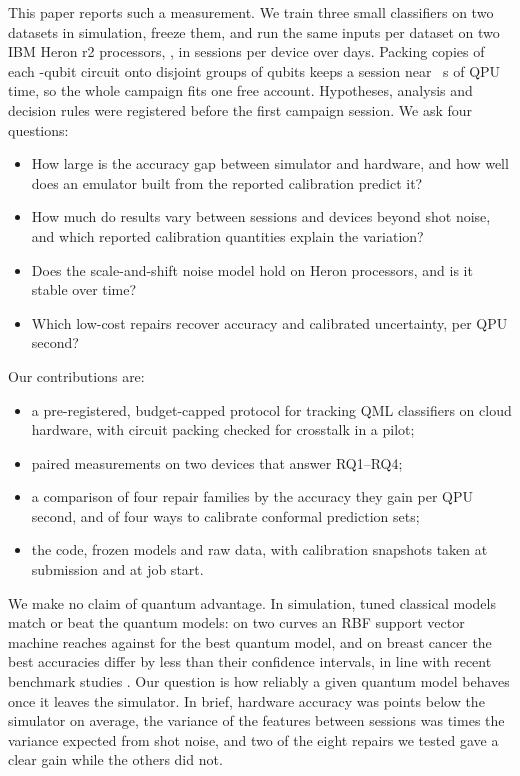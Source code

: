 This paper reports such a measurement. We train three small classifiers on two datasets in
simulation, freeze them, and run the same  inputs per dataset on two IBM
Heron r2 processors, , in  sessions per device over
 days. Packing  copies of each -qubit circuit onto
disjoint groups of qubits keeps a session near ~s of QPU time, so the
whole campaign fits one free account. Hypotheses, analysis and decision rules were registered
before the first campaign session. We ask four questions:
\begin{itemize}
\item[RQ1] How large is the accuracy gap between simulator and hardware, and how well does an
emulator built from the reported calibration predict it?
\item[RQ2] How much do results vary between sessions and devices beyond shot noise, and which
reported calibration quantities explain the variation?
\item[RQ3] Does the scale-and-shift noise model hold on Heron processors, and is it stable
over time?
\item[RQ4] Which low-cost repairs recover accuracy and calibrated uncertainty, per QPU second?
\end{itemize}

Our contributions are:
\begin{itemize}
\item a pre-registered, budget-capped protocol for tracking QML classifiers on cloud hardware,
with circuit packing checked for crosstalk in a pilot;
\item paired measurements on two devices that answer RQ1--RQ4;
\item a comparison of four repair families by the accuracy they gain per QPU second, and of
four ways to calibrate conformal prediction sets;
\item the code, frozen models and raw data, with calibration snapshots taken at submission and
at job start.
\end{itemize}

We make no claim of quantum advantage. In simulation, tuned classical models match or beat the
quantum models: on two curves an RBF support vector machine reaches
 against  for the best quantum model,
and on breast cancer the best accuracies differ by less than their confidence
intervals, in line with recent benchmark studies
\cite{bowles2024benchmarking,schuld2022advantage}. Our question is how reliably a given quantum
model behaves once it leaves the simulator. In brief, hardware accuracy was 
points below the simulator on average, %
the variance of the features between sessions was  times the variance expected from
shot noise, %
and two of the eight repairs we tested gave a clear gain while the others did not. %

